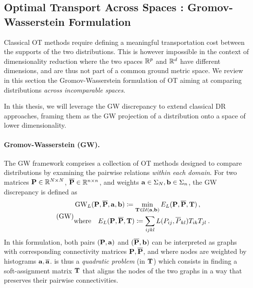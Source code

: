 \subsection{Optimal Transport Across Spaces : Gromov-Wasserstein Formulation}

Classical OT methods require defining a meaningful transportation cost between the supports of the two distributions. 
This is however impossible in the context of dimensionality reduction where the two spaces $\mathbb{R}^p$ and $\mathbb{R}^d$ have different dimensions, and are thus not part of a common ground metric space. We review in this section the Gromov-Wasserstein formulation of OT aiming at comparing distributions \emph{across incomparable spaces}.

In this thesis, we will leverage the GW discrepancy to extend classical DR approaches, framing them as the GW projection of a distribution onto a space of lower dimensionality. 

\paragraph{Gromov-Wasserstein (GW).} The GW framework \citep{memoli2011gromov,sturm2012space} comprises a collection of OT methods designed to compare distributions by examining the pairwise relations \emph{within each domain}. For two matrices ${\mathbf{P}} \in \mathbb{R}^{N \times N}$, $\overline{{\mathbf{P}}} \in \mathbb{R}^{n \times n}$, and weights ${\mathbf{a}} \in \Sigma_N, {\mathbf{b}} \in \Sigma_n$, the GW discrepancy is defined as
\begin{equation}
\label{eq:gw_pb} 
\tag{GW}
\begin{split}
	&\operatorname{GW}_L ({\mathbf{P}}, \overline{{\mathbf{P}}}, {\mathbf{a}}, {\mathbf{b}}) \coloneqq \min_{{\mathbf{T}} \in {\mathcal{U}}({\mathbf{a}}, {\mathbf{b}})} E_L({\mathbf{P}}, \overline{{\mathbf{P}}}, {\mathbf{T}})\,, \\
	&\text{where} \quad E_L({\mathbf{P}}, \overline{{\mathbf{P}}}, {\mathbf{T}}) \coloneqq \sum_{ijkl}  L(P_{ij}, \overline{P}_{kl}) T_{ik} T_{jl} \:.
\end{split}
\end{equation}
In this formulation, both pairs $({\mathbf{P}}, {\mathbf{a}})$ and $(\overline{{\mathbf{P}}}, {\mathbf{b}})$ can be interpreted as graphs with corresponding connectivity matrices ${\mathbf{P}}, \overline {{\mathbf{P}}}$, and where nodes are weighted by histograms ${\mathbf{a}}, \overline {{\mathbf{a}}}$.  is thus a \emph{quadratic problem} (in ${\mathbf{T}}$) which consists in finding a soft-assignment matrix ${\mathbf{T}}$ that aligns the nodes of the two graphs in a way that preserves their pairwise connectivities. 

